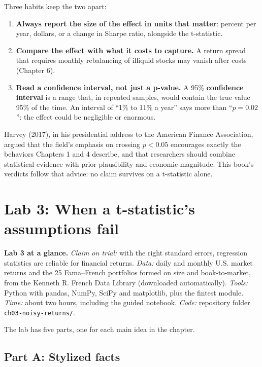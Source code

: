 Three habits keep the two apart:

\begin{enumerate}
  \item \textbf{Always report the size of the effect in units that matter}: percent per year, dollars, or a change in Sharpe ratio, alongside the t-statistic.
  \item \textbf{Compare the effect with what it costs to capture.} A return spread that requires monthly rebalancing of illiquid stocks may vanish after costs (Chapter 6).
  \item \textbf{Read a confidence interval, not just a p-value.} A 95\% \textbf{confidence interval} is a range that, in repeated samples, would contain the true value 95\% of the time. An interval of ``1\% to 11\% a year'' says more than ``$p = 0.02$'': the effect could be negligible or enormous.
\end{enumerate}

Harvey (2017), in his presidential address to the American Finance Association, argued that the field's emphasis on crossing $p < 0.05$ encourages exactly the behaviors Chapters 1 and 4 describe, and that researchers should combine statistical evidence with prior plausibility and economic magnitude. This book's verdicts follow that advice: no claim survives on a t-statistic alone.

\section{Lab 3: When a t-statistic's assumptions fail}
\label{sec:03-lab}

\begin{callout}
\textbf{Lab 3 at a glance.} \emph{Claim on trial:} with the right standard errors, regression statistics are reliable for financial returns. \emph{Data:} daily and monthly U.S. market returns and the 25 Fama--French portfolios formed on size and book-to-market, from the Kenneth R. French Data Library (downloaded automatically). \emph{Tools:} Python with pandas, NumPy, SciPy and matplotlib, plus the fintest module. \emph{Time:} about two hours, including the guided notebook. \emph{Code:} repository folder \texttt{ch03-noisy-returns/}.
\end{callout}

The lab has five parts, one for each main idea in the chapter.

\subsection*{Part A: Stylized facts}

